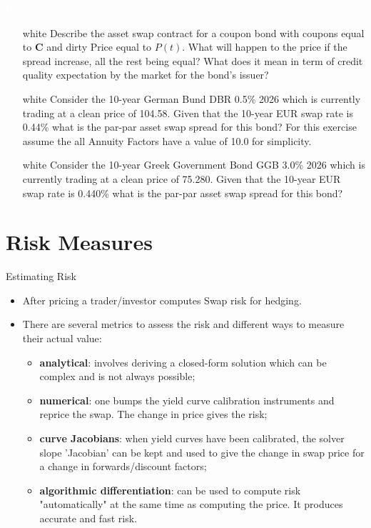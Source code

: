 \documentclass{beamer}
\begin{document}
\begin{homework}
\begin{frame}{\textcolor{white}{Homework}}
\begin{itemize}
\item[white] Describe the asset swap contract for a coupon bond with coupons equal to \textbf{C} and dirty Price equal to $P(t)$. What will happen to the price if the spread increase, all the rest being equal? What does it mean in term of credit quality expectation by the market for the bond's issuer?
\item[white]  Consider the 10-year German Bund DBR 0.5\% 2026 which is currently trading at a clean price of 104.58. 
Given that the 10-year EUR swap rate is 0.44\% what is the par-par asset swap spread for this bond? 
For this exercise assume the all Annuity Factors have a value of 10.0 for simplicity.
\item[white] Consider the 10-year Greek Government Bond GGB 3.0\% 2026 which is currently trading at a clean price of 75.280. Given that the 10-year EUR swap rate is 0.440\% what is the par-par asset swap spread for this bond?
\end{itemize}
\end{frame}
\end{homework}


\section{Risk Measures}
\begin{frame}{Estimating Risk}
\begin{itemize}
\item After pricing a trader/investor computes Swap risk for hedging.
\item There are several metrics to assess the risk and different ways to measure their actual value:
\begin{itemize}
	\item \textbf{analytical}: involves deriving a closed-form solution which can be complex and is not always possible;
	\item \textbf{numerical}: one bumps the yield curve calibration instruments and reprice the swap. The change in price gives the risk;
	\item \textbf{curve Jacobians}: when yield curves have been calibrated, the solver slope 'Jacobian' can be kept and used to give the change in swap price for a change in forwards/discount factors;
	\item \textbf{algorithmic differentiation}: can be used to compute risk "automatically" at the same time as computing the price. It produces accurate and fast risk.
\end{itemize}
\end{itemize}
\end{frame}
\end{document}
